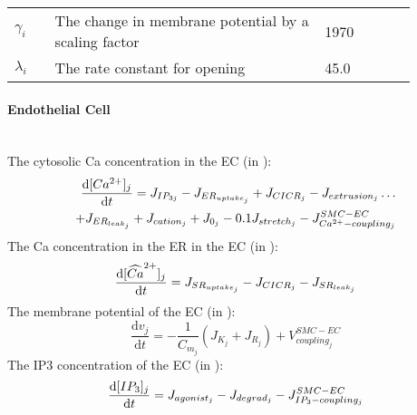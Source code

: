 \begin{table}[h!]
\centering
\begin{tabular}{| p{0.09\linewidth} | >{\footnotesize} p{0.6\linewidth} | >{\footnotesize} p{0.17\linewidth} | >{\footnotesize} p{0.02\linewidth} |}
\arrayrulecolor{lightgrey}\hline
$\gamma_{i}$				& The change in membrane potential by a scaling factor					& 1970 \mVpuM	& \cite{Koenigsberger2006} \\
$\lambda_{i} $				& The rate constant for opening											& 45.0 \pers 	& \cite{Koenigsberger2006} \\
\hline
\end{tabular}
\label{tab:dcidt}
\end{table}

\paragraph{Endothelial Cell}~\\
%
The cytosolic \gls{Ca} concentration in the \gls{EC} (in \uM):
\begin{equation} \label{eq:cj}
\begin{split}
\dfrac{\mathrm{d}[Ca^{2+}]_{j}}{\mathrm{d}t} = J_{IP_{3j}} - J_{ER_{uptake_{j}}} + J_{CICR_{j}} - J_{extrusion_{j}}\dots \\
 + J_{ER_{leak_{j}}} + J_{cation_{j}} + J_{0_{j}}- 0.1J_{stretch_{j}} - J_{Ca^{2+}-coupling_{j}}^{SMC-EC}
\end{split}
\end{equation}
%
The \gls{Ca} concentration in the \gls{ER} in the \gls{EC} (in \uM): %
\begin{equation} \label{eq:sj}
\dfrac{\mathrm{d}[\widehat{Ca}^{2+}]_{j}}{\mathrm{d}t} =  J_{SR_{uptake_{j}}} - J_{CICR_{j}} - J_{SR_{leak_{j}}}
\end{equation}
%
The membrane potential of the \gls{EC} (in \mV):
\begin{equation} \label{eq:dvjdt}
\dfrac{\mathrm{d}v_{j}}{\mathrm{d}t} =-\frac{1}{C_{m_{j}}} ( J_{K_{j}}+J_{R_{j}}) + V^{SMC-EC}_{coupling_{j}}
\end{equation}
%
The \gls{IP3} concentration of the \gls{EC} (in \uM):
\begin{equation} \label{eq:dIjdt}
\dfrac{\mathrm{d}[IP_{3}]_{j}}{\mathrm{d}t} =  J_{agonist_{j}}- J_{degrad_{j}}  - J^{SMC-EC}_{IP_{3}-coupling_{j}}
\end{equation}

